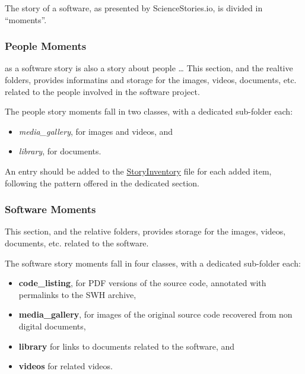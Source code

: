 \documentclass[]{article}
\providecommand{\tightlist}{%
  \setlength{\itemsep}{0pt}\setlength{\parskip}{0pt}}
\begin{document}
The story of a software, as presented by ScienceStories.io, is divided
in ``moments''.

\hypertarget{people-moments}{%
\subsubsection{People Moments}\label{people-moments}}

as a software story is also a story about people \ldots{} This section,
and the realtive folders, provides informatins and storage for the
images, videos, documents, etc. related to the people involved in the
software project.

The people story moments fall in two classes, with a dedicated
sub-folder each:

\begin{itemize}
\tightlist
\item
  \emph{media\_gallery}, for images and videos, and
\item
  \emph{library}, for documents.
\end{itemize}

An entry should be added to the
\href{https://github.com/Unipisa/Softi-Workbench/blob/structure_review/additional-materials/swh_stories_workplace/StoryInventory.md}{StoryInventory}
file for each added item, following the pattern offered in the dedicated
section.

\hypertarget{software-moments}{%
\subsubsection{Software Moments}\label{software-moments}}

This section, and the relative folders, provides storage for the images,
videos, documents, etc. related to the software.

The software story moments fall in four classes, with a dedicated
sub-folder each:

\begin{itemize}
\tightlist
\item
  \textbf{code\_listing}, for PDF versions of the source code, annotated
  with permalinks to the SWH archive,
\item
  \textbf{media\_gallery}, for images of the original source code
  recovered from non digital documents,
\item
  \textbf{library} for links to documents related to the software, and
\item
  \textbf{videos} for related videos.
\end{itemize}
\end{document}

